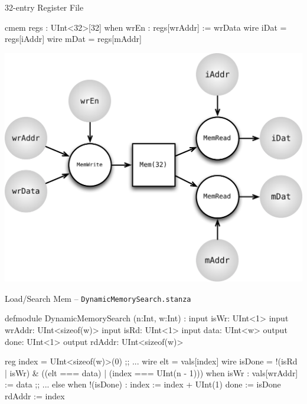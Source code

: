 \documentclass[xcolor=pdflatex,dvipsnames,table]{beamer}
\begin{document}
\begin{frame}[fragile]{32-entry Register File}

\begin{stanza}
cmem regs : UInt<32>[32]
when wrEn :
  regs[wrAddr] := wrData
wire iDat = regs[iAddr]
wire mDat = regs[mAddr]
\end{stanza}

\begin{center}
\includegraphics[height=0.55\textheight]{figs/mem.pdf} 
\end{center}

\end{frame}

\begin{frame}[fragile]{Load/Search Mem -- \tt DynamicMemorySearch.stanza}
\begin{stanza}
defmodule DynamicMemorySearch (n:Int, w:Int) :
  input  isWr:   UInt<1>
  input  wrAddr: UInt<sizeof(w)>
  input  isRd:   UInt<1>
  input  data:   UInt<w>
  output done:   UInt<1>
  output rdAddr: UInt<sizeof(w)>

  reg index = UInt<sizeof(w)>(0)
  ;; ...
  wire elt  = vals[index]
  wire isDone = !(isRd | isWr) & ((elt === data) | (index === UInt(n - 1)))
  when isWr :
    vals[wrAddr] := data
  ;; ...
  else when !(isDone) :
    index := index + UInt(1)
  done    := isDone
  rdAddr  := index
\end{stanza}
\end{frame}
\end{document}
